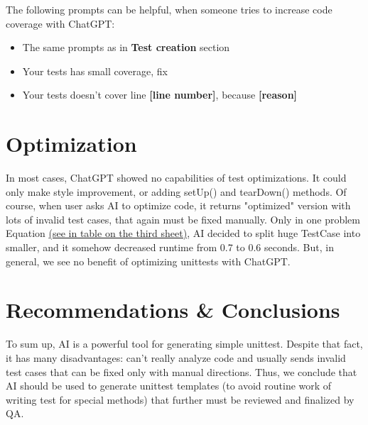 \documentclass[12pt]{report}
\begin{document}
The following prompts can be helpful, when someone tries to increase code coverage with ChatGPT:
		\begin{itemize}
			\item The same prompts as in \textbf{Test creation} section
			\item Your tests has small coverage, fix 
			\item Your tests doesn't cover line \textbf{[line number]}, because \textbf{[reason]}
			
		\end{itemize}
	
	\section{Optimization}
	
	In most cases, ChatGPT showed no capabilities of test optimizations. It could only make style improvement, or adding 
setUp() and tearDown() methods. Of course, when user asks AI to optimize code, it returns "optimized" version with lots
of invalid test cases, that again must be fixed manually. Only in one problem Equation \href{https://docs.google.com/spreadsheets/d/1qXPyAJsOOpmtxIoGqObwG5mTaLU3IWO0SQRGbjZPhEc/edit#gid=0}{(see in table on the third sheet)}, AI decided to split huge TestCase into smaller, and it somehow decreased runtime from 0.7 to 0.6 seconds. But, in general, we see no benefit of optimizing unittests with ChatGPT.
	
	\section{Recommendations \& Conclusions}
	
	To sum up, AI is a powerful tool for generating simple unittest. Despite that fact, it has many disadvantages: 
can't really analyze code and usually sends invalid test cases that can be fixed only with manual directions. 
Thus, we conclude that AI should be used to generate unittest templates (to avoid routine work of writing test for special 
methods) that further must be reviewed and finalized by QA.

	
	
\end{document}
